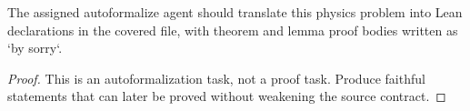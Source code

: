 \begin{theorem}
\label{thm:physics:IPhO_2026_3_C_1:target}
The assigned autoformalize agent should translate this physics problem into Lean declarations in the covered file, with theorem and lemma proof bodies written as `by sorry`.
\end{theorem}
\begin{proof}
This is an autoformalization task, not a proof task. Produce faithful statements that can later be proved without weakening the source contract.
\end{proof}
